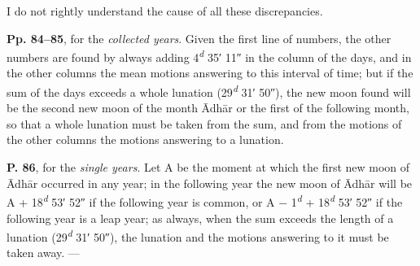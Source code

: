 \documentclass[11pt]{article}
\newcommand{\Pg}[1]{\marginpar{\footnotesize\color{gray}#1}}
\begin{document}
\par I do not rightly understand the cause of all these discrepancies.\par
\par \Pg{II 230}\textbf{Pp. 84–85}, for the \emph{collected years}. Given the first line of numbers, the other numbers are found by always adding 4\textsuperscript{\itshape d} 35′ 11″ in the column of the days, and in the other columns the mean motions answering to this interval of time; but if the sum of the days exceeds a whole lunation (29\textsuperscript{\itshape d} 31′ 50″), the new moon found will be the second new moon of the month Ādhār or the first of the following month, so that a whole lunation must be taken from the sum, and from the motions of the other columns the motions answering to a lunation.\par
\par \textbf{P. 86}, for the \emph{single years}. Let A be the moment at which the first new moon of Ādhār occurred in any year; in the following year the new moon of Ādhār will be A + 18\textsuperscript{\itshape d} 53′ 52″ if the following year is common, or A − 1\textsuperscript{\itshape d} + 18\textsuperscript{\itshape d} 53′ 52″ if the following year is a leap year; as always, when the sum exceeds the length of a lunation (29\textsuperscript{\itshape d} 31′ 50″), the lunation and the motions answering to it must be taken away. —\par
\end{document}
